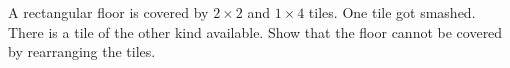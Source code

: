 A rectangular floor is covered by $2 \times 2$ and $1 \times 4$ tiles. One tile got smashed. There is a tile of the other kind available. Show that the floor cannot be covered by rearranging the tiles.
